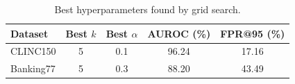 \begin{table}[t]
\centering
\caption{Best hyperparameters found by grid search.}
\label{tab:best_hyperparams}
\begin{tabular}{lcccc}
\toprule
Dataset & Best $k$ & Best $\alpha$ & AUROC (\%) & FPR@95 (\%) \\
\midrule
CLINC150 & 5 & 0.1 & 96.24 & 17.16 \\
Banking77 & 5 & 0.3 & 88.20 & 43.49 \\
\bottomrule
\end{tabular}
\end{table}